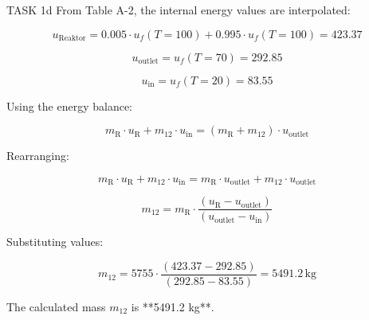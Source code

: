 TASK 1d  
From Table A-2, the internal energy values are interpolated:  

\[
u_{\text{Reaktor}} = 0.005 \cdot u_f(T=100) + 0.995 \cdot u_f(T=100) = 423.37
\]

\[
u_{\text{outlet}} = u_f(T=70) = 292.85
\]

\[
u_{\text{in}} = u_f(T=20) = 83.55
\]

Using the energy balance:  

\[
m_{\text{R}} \cdot u_{\text{R}} + m_{12} \cdot u_{\text{in}} = (m_{\text{R}} + m_{12}) \cdot u_{\text{outlet}}
\]

Rearranging:  

\[
m_{\text{R}} \cdot u_{\text{R}} + m_{12} \cdot u_{\text{in}} = m_{\text{R}} \cdot u_{\text{outlet}} + m_{12} \cdot u_{\text{outlet}}
\]

\[
m_{12} = m_{\text{R}} \cdot \frac{(u_{\text{R}} - u_{\text{outlet}})}{(u_{\text{outlet}} - u_{\text{in}})}
\]

Substituting values:  

\[
m_{12} = 5755 \cdot \frac{(423.37 - 292.85)}{(292.85 - 83.55)} = 5491.2 \, \text{kg}
\]  

The calculated mass \( m_{12} \) is **5491.2 kg**.